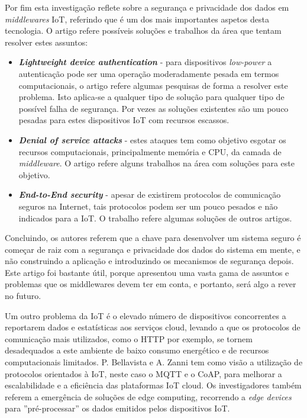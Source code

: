 Por fim esta investigação reflete sobre a segurança e privacidade dos dados em \textit{middlewares} IoT, referindo que é um dos mais importantes aspetos desta tecnologia. O artigo refere possíveis soluções e trabalhos da área que tentam resolver estes assuntos:
\begin{itemize}
\item \textbf{\textit{Lightweight device authentication}} - para dispositivos \textit{low-power} a autenticação pode ser uma operação moderadamente pesada em termos computacionais, o artigo refere algumas pesquisas de forma a resolver este problema. Isto aplica-se a qualquer tipo de solução para qualquer tipo de possível falha de segurança. Por vezes as soluções existentes são um pouco pesadas para estes dispositivos IoT com recursos escassos.

\item \textbf{\textit{Denial of service attacks}} - estes ataques tem como objetivo esgotar os recursos computacionais, principalmente memória e CPU, da camada de \textit{middleware}. O artigo refere alguns trabalhos na área com soluções para este objetivo.

\item \textbf{\textit{End-to-End security}} - apesar de existirem protocolos de comunicação seguros na Internet, tais protocolos podem ser um pouco pesados e não indicados para a IoT. O trabalho refere algumas soluções de outros artigos.
\end{itemize}

Concluindo, os autores referem que a chave para desenvolver um sistema seguro é começar de raiz com a segurança e privacidade dos dados do sistema em mente, e não construindo a aplicação e introduzindo os mecanismos de segurança depois. Este artigo foi bastante útil, porque apresentou uma vasta gama de assuntos e problemas que os middlewares devem ter em conta, e portanto, será algo a rever no futuro.

Um outro problema da IoT é o elevado número de dispositivos concorrentes a reportarem dados e estatísticas aos serviços cloud, levando a que os protocolos de comunicação mais utilizados, como o HTTP por exemplo, se tornem desadequados a este ambiente de baixo consumo energético e de recursos computacionais limitados. P. Bellavista e A. Zanni \cite{iot-mqtt-coap} tem como visão a utilização de protocolos orientados à IoT, neste caso o MQTT e o CoAP, para melhorar a escalabilidade e a eficiência das plataformas IoT cloud. Os investigadores também referem a emergência de soluções de edge computing, recorrendo a \textit{edge devices} para ''pré-processar'' os dados emitidos pelos dispositivos IoT.

